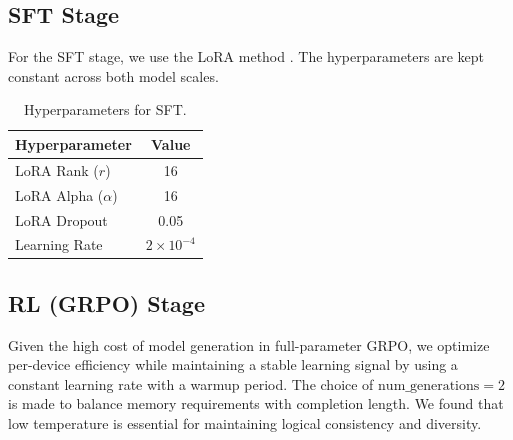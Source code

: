 \documentclass{article}
\theoremstyle{plain}
\theoremstyle{definition}
\theoremstyle{remark}
\begin{document}
\subsection{SFT Stage}
For the SFT stage, we use the LoRA method \cite{hu2022lora}. The hyperparameters are kept constant across both model scales. 

\begin{table}[ht]
\caption{Hyperparameters for SFT.}
\label{tab:sft_hyperparams}
\vskip 0.15in
\begin{center}
\begin{small}
\begin{sc}
\begin{tabular}{lc}
\toprule
Hyperparameter & Value \\
\midrule
LoRA Rank ($r$) & 16 \\
LoRA Alpha ($\alpha$) & 16 \\
LoRA Dropout & 0.05 \\
Learning Rate & $2 \times 10^{-4}$ \\
\bottomrule
\end{tabular}
\end{sc}
\end{small}
\end{center}
\vskip -0.1in
\end{table}

\subsection{RL (GRPO) Stage}
Given the high cost of model generation in full-parameter GRPO, we optimize per-device efficiency while maintaining a stable learning signal by using a constant learning rate with a warmup period. The choice of $\text{num\_generations} = 2$ is made to balance memory requirements with completion length. We found that low temperature is essential for maintaining logical consistency and diversity.
\end{document}
